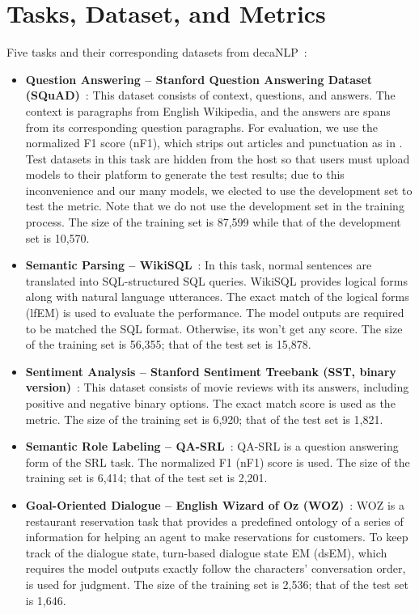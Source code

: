 \documentclass{article} \usepackage{iclr2020_conference,times}
\begin{document}
\section{Tasks, Dataset, and Metrics} \label{appendix:dataset}
Five tasks and their corresponding datasets from decaNLP~\citep{McCann2018decaNLP}:
\begin{itemize}
\item \textbf{Question Answering -- Stanford Question Answering Dataset (SQuAD)}~\citep{rajpurkar2016squad}: This dataset consists of context, questions, and answers. The context is paragraphs from English Wikipedia, and the answers are spans from its corresponding question paragraphs. For evaluation, we use the normalized F1 score (nF1), which strips out articles and punctuation as in \citet{McCann2018decaNLP}. 
Test datasets in this task are hidden from the host so that users must upload models to their platform to generate the test results; due to this inconvenience and our many models, we elected to use the development set to test the metric. 
Note that we do not use the development set in the training process. The size of the training set is 87,599 while that of the development set is 10,570.

\item \textbf{Semantic Parsing -- WikiSQL}~\citep{zhong2017seq2sql}: In this task, normal sentences are translated into SQL-structured SQL queries. WikiSQL provides logical forms along with natural language utterances. The exact match of the logical forms (lfEM) is used to evaluate the performance. The model outputs are required to be matched the SQL format. Otherwise, its won't get any score. The size of the training set is 56,355; that of the test set is 15,878.

\item \textbf{Sentiment Analysis -- Stanford Sentiment Treebank (SST, binary version)}~\citep{radford2017learning}: This dataset consists of movie reviews with its answers, including positive and negative binary options. The exact match score is used as the metric. The size of the training set is 6,920; that of the test set is 1,821.

\item \textbf{Semantic Role Labeling -- QA-SRL}~\citep{he2017deep}: QA-SRL is a question answering form of the SRL task. The normalized F1 (nF1) score is used. The size of the training set is 6,414; that of the test set is 2,201.

\item \textbf{Goal-Oriented Dialogue -- English Wizard of Oz (WOZ)}~\citep{wen2016network}: WOZ is a restaurant reservation task that provides a predefined ontology of a series of information for helping an agent to make reservations for customers. To keep track of the dialogue state, turn-based dialogue state EM (dsEM), which requires the model outputs exactly follow the characters' conversation order, is used for judgment. The size of the training set is 2,536; that of the test set is 1,646.
\end{itemize}
\end{document}
